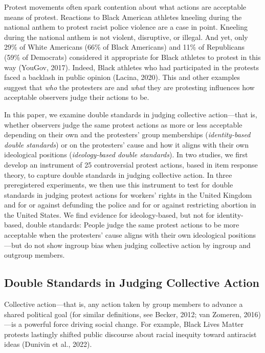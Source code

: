 \documentclass[twocolumn, 11pt, letterpaper]{article}
\begin{document}
\noindent Protest movements often spark contention about what actions
are acceptable means of protest. Reactions to Black American athletes
kneeling during the national anthem to protest racist police violence
are a case in point. Kneeling during the national anthem is not violent,
disruptive, or illegal. And yet, only 29\% of White Americans (66\% of
Black Americans) and 11\% of Republicans (59\% of Democrats) considered
it appropriate for Black athletes to protest in this way (YouGov, 2017).
Indeed, Black athletes who had participated in the protests faced a
backlash in public opinion (Lacina, 2020). This and other examples
suggest that \emph{who} the protesters are and \emph{what} they are
protesting influences how acceptable observers judge their actions to
be.

In this paper, we examine double standards in judging collective
action---that is, whether observers judge the same protest actions as
more or less acceptable depending on their own and the protesters' group
memberships (\emph{identity-based double standards}) or on the
protesters' cause and how it aligns with their own ideological positions
(\emph{ideology-based double standards}). In two studies, we first
develop an instrument of 25 controversial protest actions, based in item
response theory, to capture double standards in judging collective
action. In three preregistered experiments, we then use this instrument
to test for double standards in judging protest actions for workers'
rights in the United Kingdom and for or against defunding the police and
for or against restricting abortion in the United States. We find
evidence for ideology-based, but not for identity-based, double
standards: People judge the same protest actions to be more acceptable
when the protesters' cause aligns with their own ideological
positions---but do not show ingroup bias when judging collective action
by ingroup and outgroup members.

\hypertarget{double-standards-in-judging-collective-action}{%
\subsection{Double Standards in Judging Collective
Action}\label{double-standards-in-judging-collective-action}}

Collective action---that is, any action taken by group members to
advance a shared political goal (for similar definitions, see Becker,
2012; van Zomeren, 2016)---is a powerful force driving social change.
For example, Black Lives Matter protests lastingly shifted public
discourse about racial inequity toward antiracist ideas (Dunivin et al.,
2022).
\end{document}
